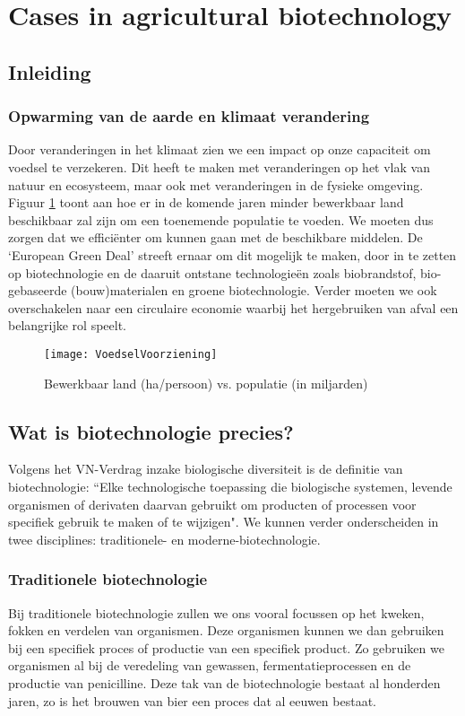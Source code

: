 \documentclass[a4paper,kul]{kulakarticle} %
\begin{document}
\section{Cases in agricultural biotechnology}
\subsection{Inleiding}
\subsubsection{Opwarming van de aarde en klimaat verandering}
Door veranderingen in het klimaat zien we een impact op onze capaciteit om voedsel te verzekeren. Dit heeft te maken met veranderingen op het vlak van natuur en ecosysteem, maar ook met veranderingen in de fysieke omgeving. Figuur \ref{fig:voedselvoorziening} toont aan hoe er in de komende jaren minder bewerkbaar land beschikbaar zal zijn om een toenemende populatie te voeden. We moeten dus zorgen dat we efficiënter om kunnen gaan met de beschikbare middelen. De `European Green Deal' streeft ernaar om dit mogelijk te maken, door in te zetten op biotechnologie en de daaruit ontstane technologieën zoals biobrandstof, bio-gebaseerde (bouw)materialen en groene biotechnologie. Verder moeten we ook overschakelen naar een circulaire economie waarbij het hergebruiken van afval een belangrijke rol speelt.
\begin{figure}[h]
	\centering
	\texttt{[image: VoedselVoorziening]}
	\caption[Voedsel voorziening]{Bewerkbaar land (ha/persoon) vs. populatie (in miljarden)}
	\label{fig:voedselvoorziening}
\end{figure}
\subsection{Wat is biotechnologie precies?}
Volgens het VN-Verdrag inzake biologische diversiteit is de definitie van biotechnologie: “Elke technologische toepassing die biologische systemen, levende organismen of derivaten daarvan gebruikt om producten of processen voor specifiek gebruik te maken of te wijzigen". We kunnen verder onderscheiden in twee disciplines: traditionele- en moderne-biotechnologie.  
\subsubsection{Traditionele biotechnologie}
Bij traditionele biotechnologie zullen we ons vooral focussen op het kweken, fokken en verdelen van organismen. Deze organismen kunnen we dan gebruiken bij een specifiek proces of productie van een specifiek product. Zo gebruiken we organismen al bij de veredeling van gewassen, fermentatieprocessen en de productie van penicilline. Deze tak van de biotechnologie bestaat al honderden jaren, zo is het brouwen van bier een proces dat al eeuwen bestaat.
\end{document}

